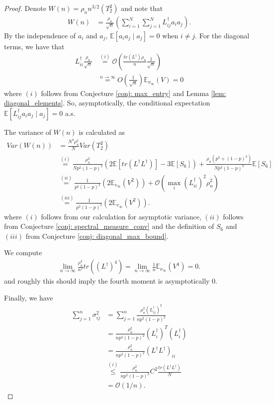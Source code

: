 \documentclass{article}
\newcommand{\Expect}[1]{\mathbb{E}\left[ #1 \right]}
\newcommand{\Linv}{L^{\dagger}}
\theoremstyle{alden}
\theoremstyle{definition}
\theoremstyle{remark}
\begin{document}
\begin{proof}
	Denote $W(n) = \rho_n n^{3/2} (T_2^2)$ and note that
	\begin{align*}
	W(n) & = \frac{\rho_n}{\sqrt{n}} \left(\sum_{i = 1}^{N} \sum_{j = 1}^{N} \Linv_{ij} a_ia_j \right).
	\end{align*}
	By the independence of $a_i$ and $a_j$, $\Expect{a_ia_j \mid a_j} = 0$ when $i \neq j$. For the diagonal terms, we have that
	\begin{align*}
	\Linv_{ii} \frac{\rho_n}{\sqrt{n}} & \overset{(i)}{=} \mathcal{O}(\frac{tr(\Linv) \rho_n}{n} \frac{1}{\sqrt{n}}) \\
	& \overset{n \to \infty}{=} O(\frac{1}{\sqrt{n}}) \mathbb{E}_{\nu_\infty}(V) = 0
	\end{align*}
	where $(i)$ follows from Conjecture \ref{conj: max_entry} and Lemma \ref{lem: diagonal_elements}. So, asymptotically, the conditional expectation $\Expect{\Linv_{ij} a_i a_j \mid a_j} = 0 $ a.s.  
	
	The variance of $W(n)$ is calculated as
	\begin{align*}
	Var(W(n)) & = \frac{N^4 \rho_n^2}{N} Var(T_2^2) \\
	& \overset{(i)}{=} \frac{\rho_n^2}{N p^2(1 - p)^2} \left( 2 \Expect {tr(\Linv \Linv)} - 3 \Expect{S_6} \right) + \frac{\rho_n \left(p^3 + (1 - p)^3 \right)}{N p^3(1 - p)^3} \Expect{S_6} \\
	& \overset{(ii)}{=} \frac{1}{p^2(1 - p)^2 } (2 \mathbb{E}_{v_{\infty}}(V^2) ) + \mathcal{O}(\max_i(\Linv_{ii})^2 \rho_n^2) \\
	& \overset{(iii)}{ = } \frac{1}{p^2(1 - p)^2 } (2 \mathbb{E}_{v_{\infty}}(V^2) ).
	\end{align*}
	where $(i)$ follows from our calculation for asymptotic variance, $(ii)$ follows from Conjecture \ref{conj: spectral_measure_conv} and the definition of $S_6$ and $(iii)$ from Conjecture \ref{conj: diagonal_max_bound}. 
	
	We compute
	\begin{align*}
	\lim_{n \to \infty} \frac{\rho_n^4}{n^2}tr((\Linv)^4) = \lim_{n \to \infty} \frac{1}{n}\mathbb{E}_{\nu_{\infty}}(V^4) = 0.
    \end{align*}
	and roughly this should imply the fourth moment is asymptotically $0$. 
	
	Finally, we have
	\begin{align*}
	\sum_{j = 1}^n \sigma_{ij}^2 & = \sum_{j = 1}^{n} \frac{\rho_n^2 (\Linv_{ij})^2}{n p^2 (1 - p)^2} \\
	 & = \frac{\rho_n^2 }{n p^2 (1 - p)^2} (\Linv_i)^T (\Linv_i) \\
	 & = \frac{\rho_n^2 }{n p^2 (1 - p)^2} (\Linv \Linv)_{ii} \\
	 & \overset{(i)}{\leq} \frac{\rho_n^2 }{n p^2 (1 - p)^2} C^2 \frac{tr(\Linv \Linv)}{N} \\
	 & = \mathcal{O}(1/n).
	\end{align*}
	

\end{proof}
\end{document}
